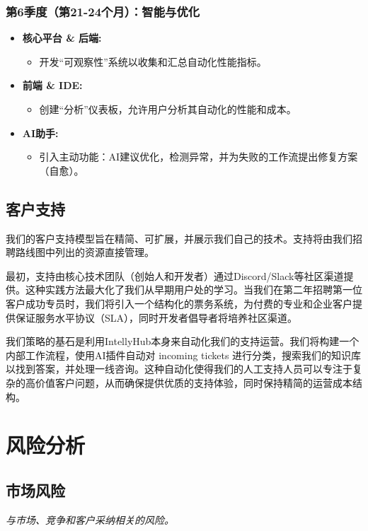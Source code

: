 \documentclass[11pt, a4paper, oneside]{article}
\begin{document}
\subsubsection*{第6季度（第21-24个月）：智能与优化}
\begin{itemize}[leftmargin=*]
    \item \textbf{核心平台 \& 后端:}
    \begin{itemize}
        \item 开发“可观察性”系统以收集和汇总自动化性能指标。
    \end{itemize}
    \item \textbf{前端 \& IDE:}
    \begin{itemize}
        \item 创建“分析”仪表板，允许用户分析其自动化的性能和成本。
    \end{itemize}
    \item \textbf{AI助手:}
    \begin{itemize}
        \item 引入主动功能：AI建议优化，检测异常，并为失败的工作流提出修复方案（自愈）。
    \end{itemize}
\end{itemize}
\subsection{客户支持}
我们的客户支持模型旨在精简、可扩展，并展示我们自己的技术。支持将由我们招聘路线图中列出的资源直接管理。

最初，支持由核心技术团队（创始人和开发者）通过Discord/Slack等社区渠道提供。这种实践方法最大化了我们从早期用户处的学习。当我们在第二年招聘第一位客户成功专员时，我们将引入一个结构化的票务系统，为付费的专业和企业客户提供保证服务水平协议（SLA），同时开发者倡导者将培养社区渠道。

我们策略的基石是利用IntellyHub本身来自动化我们的支持运营。我们将构建一个内部工作流程，使用AI插件自动对 incoming tickets 进行分类，搜索我们的知识库以找到答案，并处理一线咨询。这种自动化使得我们的人工支持人员可以专注于复杂的高价值客户问题，从而确保提供优质的支持体验，同时保持精简的运营成本结构。

\section{风险分析}
\subsection{市场风险}
\textit{与市场、竞争和客户采纳相关的风险。}
\end{document}
